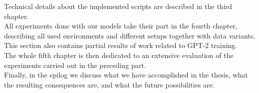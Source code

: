 Technical details about the implemented scripts are described in the third chapter.\\

All experiments done with our models take their part in the fourth chapter, describing all used environments and different setups together with data variants. This section also contains partial results of work related to GPT-2 training.\\

The whole fifth chapter is then dedicated to an extensive evaluation of the experiments carried out in the preceding part.\\

Finally, in the epilog we discuss what we have accomplished in the thesis, what the resulting consequences are, and what the future possibilities are.
